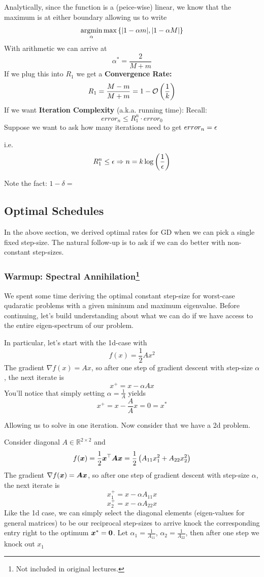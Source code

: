 \documentclass[11pt]{article}
\begin{document}
Analytically, since the function is a (peice-wise) linear, we know that the maximum is at either boundary allowing us to write \[\operatorname*{argmin}_{\alpha}\max\left\{{\left\vert 1-\alpha m \right\vert}, {\left\vert 1-\alpha M \right\vert}\right\}\]
With arithmetic we can arrive at \[\alpha^* = \frac{2}{M+m}\]
If we plug this into $R_1$ we get a \textbf{Convergence Rate:} \[R_1 = \frac{M-m}{M+m}=1-\mathcal O\left(\frac{1}{k}\right)\] 
If we want \textbf{Iteration Complexity} (a.k.a. running time):
Recall:
\[error_n \leq R_1^n \cdot error_0\]
Suppose we want to ask how many iterations need to get $error_n = \epsilon$ 

i.e. \[R_1^n\leq \epsilon \Rightarrow n=k\log\left(\frac{1}{\epsilon}\right)\]

Note the fact: $1-\delta =$ 



\subsection{Optimal Schedules}

In the above section, we derived optimal rates for GD when we can pick a single fixed step-size. The natural follow-up is to ask if we can do better with non-constant step-sizes. 

\subsubsection[Warmup: Spectral Annihilation]{Warmup: Spectral Annihilation\footnote{Not included in original lectures.}}

We spent some time deriving the optimal constant step-size for worst-case qudaratic problems with a given mininum and maximum eigenvalue. 
Before continuing, let's build understanding about what we can do if we have access to the entire eigen-spectrum of our problem.

In particular, let's start with the 1d-case with \[f(x) = \frac{1}{2}Ax^2\] The gradient $\nabla f(x) = Ax$, so after one step of gradient descent with step-size $\alpha$, the next iterate is 
\[x^+ = x - \alpha Ax\]
You'll notice that simply setting $\alpha = \frac{1}{A}$ yields \[x^+ = x - \frac{A}{A} x = 0 = x^*\]

Allowing us to solve in one iteration. Now consider that we have a 2d problem.

Consider diagonal $A \in \mathbb R^{2\times 2}$  and \[f(\bm{x}) = \frac{1}{2}\bm{x}^\top \bm{A}\bm{x} = \frac{1}{2}\left(A_{11}x_1^2 + A_{22}x_2^2 \right)\] The gradient $\nabla f(\bm{x}) = \bm{A}\bm{x}$, so after one step of gradient descent with step-size $\alpha$, the next iterate is 
\[x^+_1 = x - \alpha A_{11} x \]
\[x^+_2 = x - \alpha A_{22} x \]
Like the 1d case, we can simply select the diagonal elements (eigen-values for general matrices) to be our reciprocal step-sizes to arrive knock the corresponding entry right to the optimum $\bm{x}^* = \bm{0}$. Let $\alpha_1 = \frac{1}{A_{11}}$, $\alpha_2 = \frac{1}{A_{22}}$, then after one step we knock out $x_1$
\end{document}
